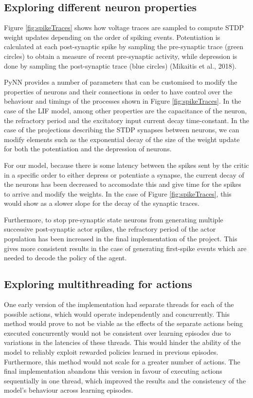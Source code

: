 \documentclass[10pt]{article}
\begin{document}
    \subsection{Exploring different neuron properties}

    Figure \ref{fig:spikeTraces} shows how voltage traces are sampled to compute STDP weight updates depending on the order of spiking events. Potentiation is calculated at each post-synaptic spike by sampling the pre-synaptic trace (green circles) to obtain a measure of recent pre-synaptic activity, while depression is done by sampling the post-synaptic trace (blue circles) (Mikaitis et al., 2018).

    PyNN provides a number of parameters that can be customised to modify the properties of neurons and their connections in order to have control over the behaviour and timings of the processes shown in Figure \ref{fig:spikeTraces}. In the case of the LIF model, among other properties are the capacitance of the neuron, the refractory period and the excitatory input current decay time-constant. In the case of the projections describing the STDP synapses between neurons, we can modify elements such as the exponential decay of the size of the weight update for both the potentiation and the depression of neurons.

    For our model, because there is some latency between the spikes sent by the critic in a specific order to either depress or potentiate a synapse, the current decay of the neurons has been decreased to accomodate this and give time for the spikes to arrive and modify the weights. In the case of Figure \ref{fig:spikeTraces}, this would show as a slower slope for the decay of the synaptic traces.
    
    Furthermore, to stop pre-synaptic state neurons from generating multiple successive post-synaptic actor spikes, the refractory period of the actor population has been increased in the final implementation of the project. This gives more consistent results in the case of generating first-spike events which are needed to decode the policy of the agent.

    \subsection{Exploring multithreading for actions}

    One early version of the implementation had separate threads for each of the possible actions, which would operate independently and concurrently. This method would prove to not be viable as the effects of the separate actions being executed concurrently would not be consistent over learning episodes due to variations in the latencies of these threads. This would hinder the ability of the model to reliably exploit rewarded policies learned in previous episodes. Furthermore, this method would not scale for a greater number of actions. The final implementation abandons this version in favour of executing actions sequentially in one thread, which improved the results and the consistency of the model's behaviour across learning episodes.
    
\end{document}

